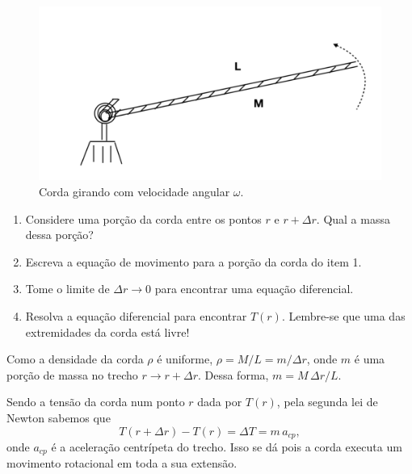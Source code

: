 \documentclass[]{IMTexam}
\begin{document}
\begin{questions}
	\begin{figure}[H]
		\centering
		\includegraphics[width=0.7\linewidth]{screenshot001}
		\caption{Corda girando com velocidade angular $ \omega $.}
		\label{fig:fig1}
	\end{figure}

	\begin{enumerate}
		\item Considere uma porção da corda entre os pontos $ r $ e $ r + \Delta r $. Qual a massa dessa porção?
		\item Escreva a equação de movimento para a porção da corda do item 1.
		\item Tome o limite de $ \Delta r \to 0 $ para encontrar uma equação diferencial.
		\item Resolva a equação diferencial para encontrar $ T(r) $. Lembre-se que uma das extremidades da corda está livre!
	\end{enumerate}

	\begin{solution}
		\begin{unindent}[start=1]
			\item Como a densidade da corda $ \rho $ é uniforme, $ \rho=M/L=m/\Delta r $, onde $ m $ é uma porção de massa no trecho $ r\to r+\Delta r $. Dessa forma, $ m=M\,\Delta r/L $.

			\item Sendo a tensão da corda num ponto $ r $ dada por $ T(r) $, pela segunda lei de Newton sabemos que
			\begin{equation}\label{eq:deltaT}
				T(r+\Delta r)-T(r)=\Delta T=m\,a_{cp},
			\end{equation}
			onde $ a_{cp} $ é a aceleração centrípeta do trecho. Isso se dá pois a corda executa um movimento rotacional em toda a sua extensão.


\end{unindent}
\end{solution}
\end{questions}
\end{document}
